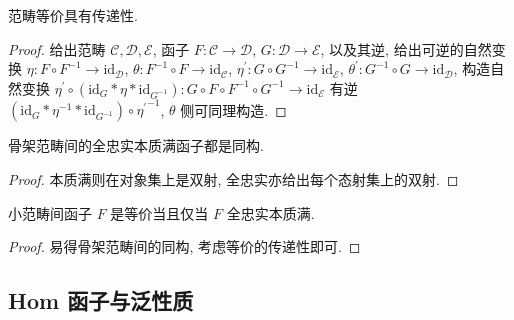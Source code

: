 \begin{lemma}
    范畴等价具有传递性.

    \begin{proof}
        给出范畴 \(\mathcal{C},\mathcal{D},\mathcal{E}\), 函子 \(F : \mathcal{C} \to \mathcal{D}\), \(G : \mathcal{D} \to \mathcal{E}\), 
        以及其逆, 给出可逆的自然变换 \(\eta : F \circ F^{-1} \to \mathrm{id}_{\mathcal{D}}\), \(\theta : F^{-1} \circ F \to \mathrm{id}_{\mathcal{C}}\),
        \(\eta^\prime : G \circ G^{-1} \to \mathrm{id}_{\mathcal{E}}\), \(\theta^\prime : G^{-1} \circ G \to \mathrm{id}_{\mathcal{D}}\), 构造自然变换
        \(\eta^\prime \circ (\mathrm{id}_G \ast \eta \ast \mathrm{id}_{G^{-1}}) : G \circ F \circ F^{-1} \circ G^{-1} \to \mathrm{id}_{\mathcal{E}}\) 有逆
        \((\mathrm{id}_G \ast \eta^{-1} \ast \mathrm{id}_{G^{-1}}) \circ {\eta^{\prime}}^{-1}\),  \(\theta\) 侧可同理构造.
    \end{proof}
\end{lemma}

\begin{lemma}
    骨架范畴间的全忠实本质满函子都是同构.

    \begin{proof}
        本质满则在对象集上是双射, 全忠实亦给出每个态射集上的双射.
    \end{proof}
\end{lemma}

\begin{lemma}
    小范畴间函子 \(F\) 是等价当且仅当 \(F\) 全忠实本质满.

    \begin{proof}
        易得骨架范畴间的同构, 考虑等价的传递性即可.
    \end{proof}
\end{lemma}

\subsection{Hom 函子与泛性质}

